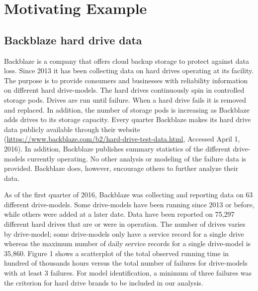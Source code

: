 \documentclass[12pt]{article}
\begin{document}
\section{Motivating Example}
\label{sec:Data}
\subsection{Backblaze hard drive data}
Backblaze is a company that offers cloud backup storage to protect against data loss.  Since 2013 it has been collecting data on hard drives operating at its facility.  The purpose is to provide consumers and businesses with reliability information on different hard drive-models.  The hard drives continuously spin in controlled storage pods.  Drives are run until failure.  When a hard drive fails it is removed and replaced.  In addition, the number of storage pods is increasing as Backblaze adds drives to its storage capacity.  Every quarter Backblaze makes its hard drive data publicly available through their website (\url{https://www.backblaze.com/b2/hard-drive-test-data.html}, Accessed April 1, 2016)\nocite{backblaze}. In addition, Backblaze publishes summary statistics of the different drive-models currently operating.  No other analysis or modeling of the failure data is provided.  Backblaze does, however, encourage others to further analyze their data. 

As of the first quarter of 2016, Backblaze was collecting and reporting data on 63 different drive-models.  Some drive-models have been running since 2013 or before, while others were added at a later date.  Data have been reported on 75,297 different hard drives that are or were in operation.  The number of drives varies by drive-model; some drive-models only have a service record for a single drive whereas the maximum number of daily service records for a single drive-model is 35,860.  Figure 1 shows a scatterplot of the total observed running time in hundred of thousands hours versus the total number of failures for drive-models with at least 3 failures.  For model identification, a minimum of three failures was the criterion for hard drive brands to be included in our analysis.  
\end{document}
